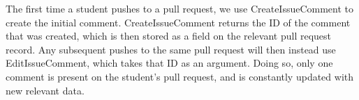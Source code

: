 The first time a student pushes to a pull request, we use CreateIssueComment to create the initial comment.
CreateIssueComment returns the ID of the comment that was created, which is then stored as a field on the relevant pull request record.
Any subsequent pushes to the same pull request will then instead use EditIssueComment, which takes that ID as an argument.
Doing so, only one comment is present on the student's pull request, and is constantly updated with new relevant data.